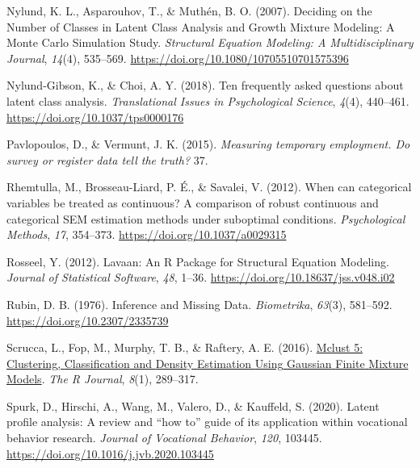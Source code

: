 \documentclass[
  ,man,floatsintext]{apa6}
\newlength{\cslhangindent}
\newlength{\cslentryspacingunit} %
\newenvironment{CSLReferences}[2] %
 {%
  \setlength{\parindent}{0pt}
  \ifodd #1
  \let\oldpar\par
  \def\par{\hangindent=\cslhangindent\oldpar}
  \fi
  \setlength{\parskip}{#2\cslentryspacingunit}
 }%
 {}
\begin{document}
\begin{CSLReferences}{1}{0}
\leavevmode{}%
Nylund, K. L., Asparouhov, T., \& Muthén, B. O. (2007). Deciding on the {Number} of {Classes} in {Latent} {Class} {Analysis} and {Growth} {Mixture} {Modeling}: {A} {Monte} {Carlo} {Simulation} {Study}. \emph{Structural Equation Modeling: A Multidisciplinary Journal}, \emph{14}(4), 535--569. \url{https://doi.org/10.1080/10705510701575396}

\leavevmode{}%
Nylund-Gibson, K., \& Choi, A. Y. (2018). Ten frequently asked questions about latent class analysis. \emph{Translational Issues in Psychological Science}, \emph{4}(4), 440--461. \url{https://doi.org/10.1037/tps0000176}

\leavevmode{}%
Pavlopoulos, D., \& Vermunt, J. K. (2015). \emph{Measuring temporary employment. {Do} survey or register data tell the truth?} 37.

\leavevmode{}%
Rhemtulla, M., Brosseau-Liard, P. É., \& Savalei, V. (2012). When can categorical variables be treated as continuous? {A} comparison of robust continuous and categorical {SEM} estimation methods under suboptimal conditions. \emph{Psychological Methods}, \emph{17}, 354--373. \url{https://doi.org/10.1037/a0029315}

\leavevmode{}%
Rosseel, Y. (2012). Lavaan: {An} {R} {Package} for {Structural} {Equation} {Modeling}. \emph{Journal of Statistical Software}, \emph{48}, 1--36. \url{https://doi.org/10.18637/jss.v048.i02}

\leavevmode{}%
Rubin, D. B. (1976). Inference and {Missing} {Data}. \emph{Biometrika}, \emph{63}(3), 581--592. \url{https://doi.org/10.2307/2335739}

\leavevmode{}%
Scrucca, L., Fop, M., Murphy, T. B., \& Raftery, A. E. (2016). \href{https://www.ncbi.nlm.nih.gov/pmc/articles/PMC5096736}{Mclust 5: {Clustering}, {Classification} and {Density} {Estimation} {Using} {Gaussian} {Finite} {Mixture} {Models}}. \emph{The R Journal}, \emph{8}(1), 289--317.

\leavevmode{}%
Spurk, D., Hirschi, A., Wang, M., Valero, D., \& Kauffeld, S. (2020). Latent profile analysis: {A} review and {``how to''} guide of its application within vocational behavior research. \emph{Journal of Vocational Behavior}, \emph{120}, 103445. \url{https://doi.org/10.1016/j.jvb.2020.103445}


\end{CSLReferences}
\end{document}
